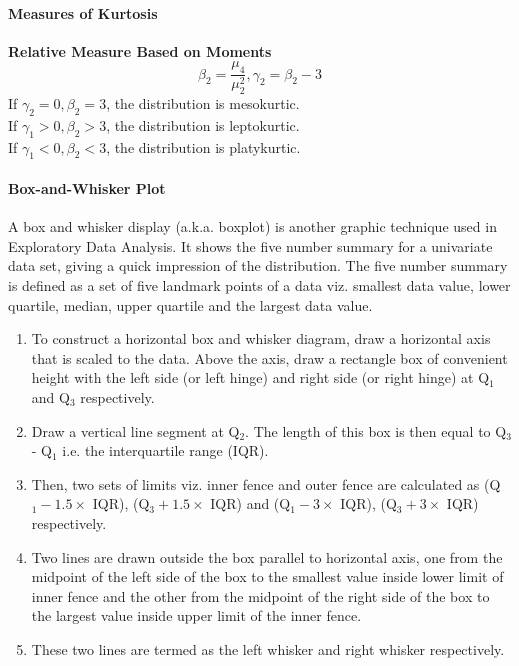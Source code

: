 \documentclass[
10pt, %
a4paper, %
]{report}
\begin{document}
\paragraph*{Measures of Kurtosis}
\textbf{Relative Measure Based on Moments}
\[\beta_2 = \frac{\mu_4}{\mu_2^2}, \gamma_2 = \beta_2 - 3\]
If \(\gamma_2 = 0, \beta_2 = 3\), the distribution is mesokurtic. \\
If \(\gamma_1 > 0, \beta_2 > 3\), the distribution is leptokurtic.\\
If \(\gamma_1 < 0, \beta_2 < 3\), the distribution is platykurtic.\\

\paragraph*{Box-and-Whisker Plot}


A box and whisker display (a.k.a. boxplot) is another graphic technique used in Exploratory Data Analysis. It shows the five number summary for a univariate data set, giving a quick impression of the distribution. The five number summary is defined as a set of five landmark points of a data viz. smallest data value, lower quartile, median, upper quartile and the largest data value.

\begin{enumerate}[Step 1.]
\item To construct a horizontal box and whisker diagram, draw a horizontal axis that is scaled to the data. Above the axis, draw a rectangle box of convenient height with the left side (or left hinge) and right side (or right hinge) at Q\(_1\) and Q\(_3\) respectively. 
\item Draw a vertical line segment at Q\(_2\). The length of this box is then equal to Q\(_3\) - Q\(_1\) i.e. the interquartile range (IQR).
\item Then, two sets of limits viz. inner fence and outer fence are calculated as (Q\(_1 - 1.5 \times\) IQR), (Q\(_3 + 1.5 \times\) IQR) and (Q\(_1 - 3 \times\) IQR), (Q\(_3 + 3 \times\) IQR) respectively. 
\item Two lines are drawn outside the box parallel to horizontal axis, one from the midpoint of the left side of the box to the smallest value inside lower limit of inner fence and the other from the midpoint of the right side of the box to the largest value inside upper limit of the inner fence.
\item These two lines are termed as the left whisker and right whisker respectively.
\end{enumerate}
\end{document}
